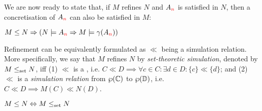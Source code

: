 We are now ready to state that, if $M$ refines $N$ and $A_{\textcolor{red}{n}}$ is satisfied in $N$, then a concretisation of $A_{\textcolor{red}{n}}$ can also be satisfied in $M$:

\begin{theorem} \label{thm:traj-refines}
$M \leq N \Rightarrow (N \models A_{\textcolor{red}{n}} \Rightarrow M \models \gamma(A_{\textcolor{red}{n}}))$
\end{theorem}


Refinement can be equivalently formulated as $\ll$ being a simulation relation. More specifically, we say that $M$ refines $N$ by \textit{set-theoretic simulation}, denoted by $M \leq_{\textrm{set}} N$, iff (1) $\ll$ is a , i.e. $C \ll D \implies \forall c \in C: \exists d \in D: \{ c \} \ll \{ d \}$; and (2) $\ll$ is a \textit{simulation relation} from $\wp(\mathbb{C})$ to $\wp(\mathbb{D})$, i.e. $C \ll D \implies M(C) \ll N(D)$.




\begin{theorem} \label{thm:traj-equal-set}
$M \leq N \Leftrightarrow M \leq_{\textrm{set}} N$
\end{theorem}

\noindent {}
